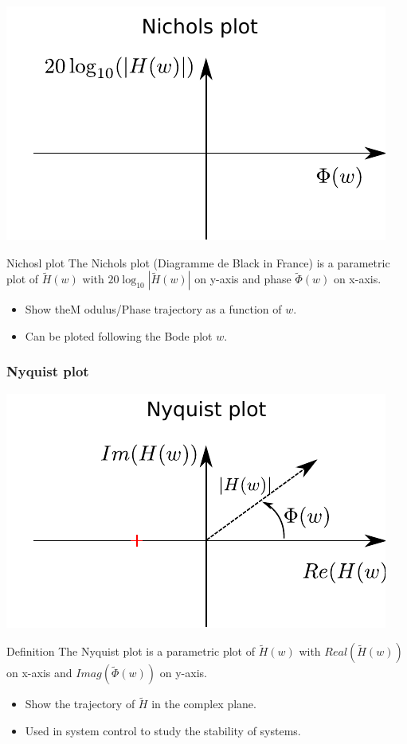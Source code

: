     \begin{center}
        \includegraphics[width=.5\linewidth]{imgs/fourier/diagramme_nichols}
      \end{center}
        \begin{block}{Nichosl plot}
          The Nichols plot (Diagramme de Black in France) is a parametric plot of  $\tilde H(w)$ with 
      $20\log_{10}|\tilde H(w)|$ on y-axis and phase $\tilde \Phi(w)$ on x-axis.
      \begin{itemize}
      \item Show theM odulus/Phase trajectory as a function of $w$.
      \item Can be ploted following the Bode plot $w$.
      \end{itemize}
        \end{block}


        \frametitle{Nyquist plot}
        \begin{center}
          \includegraphics[width=.5\linewidth]{imgs/fourier/diagramme_nyquist}
        \end{center}
        \begin{block}{Definition}
          The Nyquist plot is a parametric plot of  $\tilde H(w)$ with 
        $Real(\tilde H(w))$ on x-axis and  $Imag(\tilde \Phi(w))$ on y-axis.
        \begin{itemize}
          \item Show the trajectory of $\tilde H$ in the complex plane.
          \item Used in system control to study the stability of systems.
        \end{itemize}
        \end{block}


